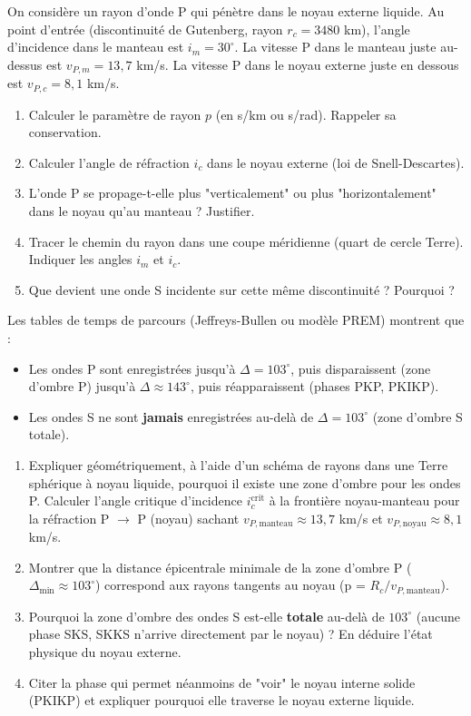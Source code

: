 \documentclass[11pt]{article}
\begin{document}
\begin{exercice}
On considère un rayon d'onde P qui pénètre dans le noyau externe liquide. Au point d'entrée (discontinuité de Gutenberg, rayon $r_c = 3480$ km), l'angle d'incidence dans le manteau est $i_m = 30^\circ$. La vitesse P dans le manteau juste au-dessus est $v_{P,m} = 13,7$ km/s. La vitesse P dans le noyau externe juste en dessous est $v_{P,c} = 8,1$ km/s.
\begin{enumerate}
    \item Calculer le paramètre de rayon $p$ (en s/km ou s/rad). Rappeler sa conservation.
    \item Calculer l'angle de réfraction $i_c$ dans le noyau externe (loi de Snell-Descartes).
    \item L'onde P se propage-t-elle plus "verticalement" ou plus "horizontalement" dans le noyau qu'au manteau ? Justifier.
    \item Tracer le chemin du rayon dans une coupe méridienne (quart de cercle Terre). Indiquer les angles $i_m$ et $i_c$.
    \item Que devient une onde S incidente sur cette même discontinuité ? Pourquoi ?
\end{enumerate}
\end{exercice}

\begin{exercice}
Les tables de temps de parcours (Jeffreys-Bullen ou modèle PREM) montrent que :
\begin{itemize}
    \item Les ondes P sont enregistrées jusqu'à $\Delta = 103^\circ$, puis disparaissent (zone d'ombre P) jusqu'à $\Delta \approx 143^\circ$, puis réapparaissent (phases PKP, PKIKP).
    \item Les ondes S ne sont \textbf{jamais} enregistrées au-delà de $\Delta = 103^\circ$ (zone d'ombre S totale).
\end{itemize}
\begin{enumerate}
    \item Expliquer géométriquement, à l'aide d'un schéma de rayons dans une Terre sphérique à noyau liquide, pourquoi il existe une zone d'ombre pour les ondes P. Calculer l'angle critique d'incidence $i_c^{\text{crit}}$ à la frontière noyau-manteau pour la réfraction P $\to$ P (noyau) sachant $v_{P,\text{manteau}} \approx 13,7$ km/s et $v_{P,\text{noyau}} \approx 8,1$ km/s.
    \item Montrer que la distance épicentrale minimale de la zone d'ombre P ($\Delta_{\min} \approx 103^\circ$) correspond aux rayons tangents au noyau (p = $R_c / v_{P,\text{manteau}}$).
    \item Pourquoi la zone d'ombre des ondes S est-elle \textbf{totale} au-delà de $103^\circ$ (aucune phase SKS, SKKS n'arrive directement par le noyau) ? En déduire l'état physique du noyau externe.
    \item Citer la phase qui permet néanmoins de "voir" le noyau interne solide (PKIKP) et expliquer pourquoi elle traverse le noyau externe liquide.
\end{enumerate}
\end{exercice}
\end{document}
